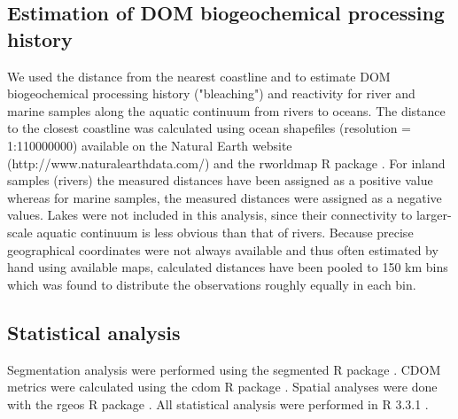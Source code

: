 \subsection*{Estimation of DOM biogeochemical processing history}

We used the distance from the nearest coastline and  to estimate DOM biogeochemical processing history ("bleaching") and reactivity for river and marine samples along the aquatic continuum from rivers to oceans. The distance to the closest coastline was calculated using ocean shapefiles (resolution = 1:110000000) available on the Natural Earth website (http://www.naturalearthdata.com/) and the rworldmap R package \citep{South2011}. For inland samples (rivers) the measured distances have been assigned as a positive value whereas for marine samples, the measured distances were assigned as a negative values. Lakes were not included in this analysis, since their connectivity to larger-scale aquatic continuum is less obvious than that of rivers. Because precise geographical coordinates were not always available and thus often estimated by hand using available maps, calculated distances have been pooled to 150 km bins which was found to distribute the observations roughly equally in each bin.

\subsection*{Statistical analysis}

Segmentation analysis were performed using the segmented R package \citep{Muggeo2003, Muggeo2008}. CDOM metrics were calculated using the cdom R package \citep{Massicotte2016MC}. Spatial analyses were done with the rgeos R package \citep{Bivand2016}. All statistical analysis were performed in R 3.3.1 \citep{RCoreTeam2016}.
